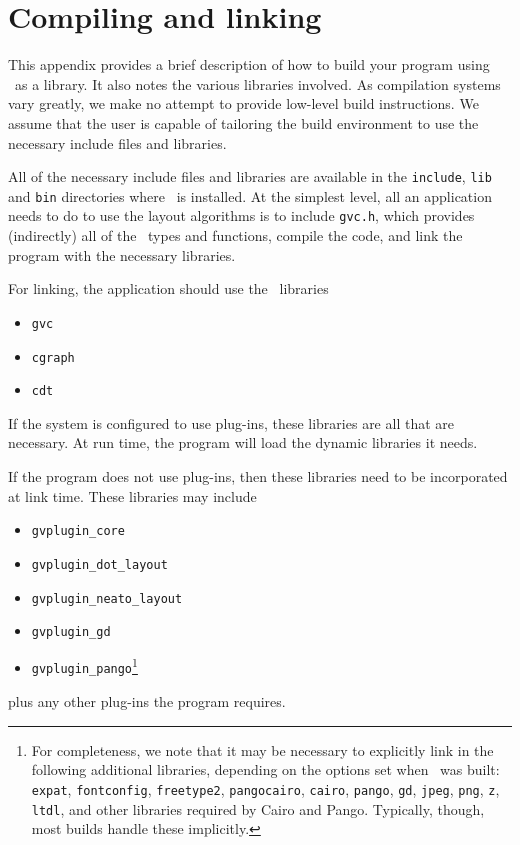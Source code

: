 \section{Compiling and linking}
\label{sec:build}
This appendix provides a brief description of how to build
your program using \gviz\ as a library. It also notes the 
various libraries involved. As compilation systems vary
greatly, we make no attempt to provide low-level build
instructions. We assume that the user is capable of tailoring
the build environment to use the necessary include files and
libraries.

All of the necessary include files and libraries are available
in the {\tt include}, {\tt lib} and {\tt bin} directories where \gviz\
is installed. At the simplest level, all an application needs
to do to use the layout algorithms is to include {\tt gvc.h},
which provides (indirectly) all of the \gviz\ types and functions,
compile the code,
and link the program with the necessary libraries.

For linking, the application should use the \gviz\ libraries 
\begin{itemize}
\item {\tt gvc}
\item {\tt cgraph}
\item {\tt cdt}
\end{itemize}
If the system is configured to use plug-ins, these libraries
are all that are necessary. At run time, the program will
load the dynamic libraries it needs.

If the program does not use plug-ins, then these libraries
need to be incorporated at link time. These libraries may
include
\begin{itemize}
\item {\tt gvplugin\_core}
\item {\tt gvplugin\_dot\_layout}
\item {\tt gvplugin\_neato\_layout}
\item {\tt gvplugin\_gd}
\item {\tt gvplugin\_pango}\footnote{
For completeness, we note that it may be necessary to explicitly
link in the following additional libraries, depending
on the options set when \gviz\ was built:
{\tt expat},
{\tt fontconfig},
{\tt freetype2},
{\tt pangocairo},
{\tt cairo},
{\tt pango},
{\tt gd},
{\tt jpeg},
{\tt png},
{\tt z}, 
{\tt ltdl},
and other libraries required by Cairo and Pango.
Typically, though, most builds handle these implicitly.}
\end{itemize}
plus any other plug-ins the program requires.

